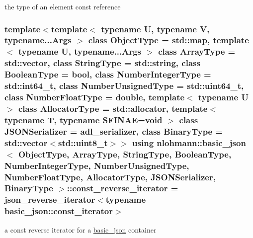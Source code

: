 the type of an element const reference 

\subsubsection[{\texorpdfstring{const\+\_\+reverse\+\_\+iterator}{const_reverse_iterator}}]{\setlength{\rightskip}{0pt plus 5cm}template$<$template$<$ typename U, typename V, typename...\+Args $>$ class Object\+Type = std\+::map, template$<$ typename U, typename...\+Args $>$ class Array\+Type = std\+::vector, class String\+Type  = std\+::string, class Boolean\+Type  = bool, class Number\+Integer\+Type  = std\+::int64\+\_\+t, class Number\+Unsigned\+Type  = std\+::uint64\+\_\+t, class Number\+Float\+Type  = double, template$<$ typename U $>$ class Allocator\+Type = std\+::allocator, template$<$ typename T, typename S\+F\+I\+N\+A\+E=void $>$ class J\+S\+O\+N\+Serializer = adl\+\_\+serializer, class Binary\+Type  = std\+::vector$<$std\+::uint8\+\_\+t$>$$>$ using {\bf nlohmann\+::basic\+\_\+json}$<$ Object\+Type, Array\+Type, String\+Type, Boolean\+Type, Number\+Integer\+Type, Number\+Unsigned\+Type, Number\+Float\+Type, Allocator\+Type, J\+S\+O\+N\+Serializer, Binary\+Type $>$\+::{\bf const\+\_\+reverse\+\_\+iterator} =  {\bf json\+\_\+reverse\+\_\+iterator}$<$typename {\bf basic\+\_\+json\+::const\+\_\+iterator}$>$}\hypertarget{classnlohmann_1_1basic__json_aa7dba16ed9ee97380aeb17a207dd919a}{}\label{classnlohmann_1_1basic__json_aa7dba16ed9ee97380aeb17a207dd919a}


a const reverse iterator for a \hyperlink{classnlohmann_1_1basic__json}{basic\+\_\+json} container 

